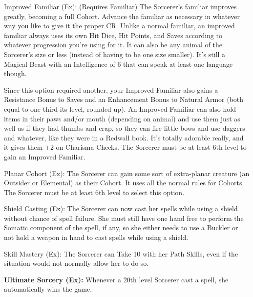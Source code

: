 \begin{description*}
\item[Improved Familiar (Ex):] (Requires Familiar) The Sorcerer's familiar improves greatly, becoming a full Cohort. Advance the familiar as necessary in whatever way you like to give it the proper CR. Unlike a normal familiar, an improved familiar always uses its own Hit Dice, Hit Points, and Saves according to whatever progression you're using for it. It can also be any animal of the Sorcerer's size or less (instead of having to be one size smaller). It's still a Magical Beast with an Intelligence of 6 that can speak at least one language though.

Since this option required another, your Improved Familiar also gains a Resistance Bonus to Saves and an Enhancement Bonus to Natural Armor (both equal to one third its level, rounded up). An Improved Familiar can also hold items in their paws and/or mouth (depending on animal) and use them just as well as if they had thumbs and crap, so they can fire little bows and use daggers and whatever, like they were in a Redwall book. It's totally adorable really, and it gives them +2 on Charisma Checks. The Sorcerer must be at least 6th level to gain an Improved Familiar.

\item[Planar Cohort (Ex):] The Sorcerer can gain some sort of extra-planar creature (an Outsider or Elemental) as their Cohort. It uses all the normal rules for Cohorts. The Sorcerer must be at least 6th level to select this option.

\item[Shield Casting (Ex):] The Sorcerer can now cast her spells while using a shield without chance of spell failure. She must still have one hand free to perform the Somatic component of the spell, if any, so she either needs to use a Buckler or not hold a weapon in hand to cast spells while using a shield.

\item[Skill Mastery (Ex):] The Sorcerer can Take 10 with her Path Skills, even if the situation would not normally allow her to do so.

\end{description*}

\textbf{Ultimate Sorcery (Ex):} Whenever a 20th level Sorcerer cast a spell, she automatically wins the game.
